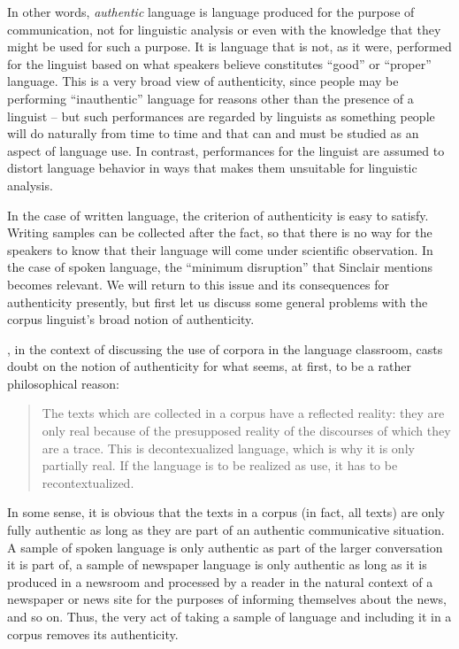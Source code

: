 In other words, \emph{authentic} language is language produced for the purpose of communication, not for linguistic analysis or even with the knowledge that they might be used for such a purpose. It is language that is not, as it were, performed for the linguist based on what speakers believe constitutes ``good'' or ``proper'' language. This is a very broad view of authenticity, since people may be performing ``inauthentic'' language for reasons other than the presence of a linguist -- but such performances are regarded by linguists as something people will do naturally from time to time and that can and must be studied as an aspect of language use. In contrast, performances for the linguist are assumed to distort language behavior in ways that makes them unsuitable for linguistic analysis.

In the case of written language, the criterion of authenticity is easy to satisfy. Writing samples can be collected after the fact, so that there is no way for the speakers to know that their language will come under scientific observation. In the case of spoken language, the ``minimum disruption'' that Sinclair mentions becomes relevant. We will return to this issue and its consequences for authenticity presently, but first let us discuss some general problems with the corpus linguist's broad notion of authenticity.

\citet{widdowson_limitations_2000}, in the context of discussing the use of corpora in the language classroom, casts doubt on the notion of authenticity for what seems, at first, to be a rather philosophical reason: 

\begin{quotation}
The texts which are collected in a corpus have a reflected reality: they are only real because of the presupposed reality of the discourses of which they are a trace. This is decontexualized language, which is why it is only partially real. If the language is to be realized as use, it has to be recontextualized. \citep[7]{widdowson_limitations_2000}
\end{quotation}

In some sense, it is obvious that the texts in a corpus (in fact, all texts) are only fully authentic as long as they are part of an authentic communicative situation. A sample of spoken language is only authentic as part of the larger conversation it is part of, a sample of newspaper language is only authentic as long as it is produced in a newsroom and processed by a reader in the natural context of a newspaper or news site for the purposes of informing themselves about the news, and so on. Thus, the very act of taking a sample of language and including it in a corpus removes its authenticity.

